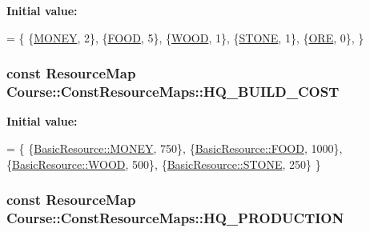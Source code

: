 {\bfseries Initial value\-:}
\begin{DoxyCode}
= \{
    \{\hyperlink{namespaceCourse_a02d49c04029594d4adba79b84bb85f65aff016add6bbbdbb44abf1d2d7f215ec0}{MONEY}, 2\},
    \{\hyperlink{namespaceCourse_a02d49c04029594d4adba79b84bb85f65a7018c47af38bfc1390a89e70b4cf4760}{FOOD}, 5\},
    \{\hyperlink{namespaceCourse_a02d49c04029594d4adba79b84bb85f65a87287be3009253b983ffb2e9f91eef22}{WOOD}, 1\},
    \{\hyperlink{namespaceCourse_a02d49c04029594d4adba79b84bb85f65a8598c3079c2be7785410e724cc190229}{STONE}, 1\},
    \{\hyperlink{namespaceCourse_a02d49c04029594d4adba79b84bb85f65af416a215c7dad21349df38d35be0a1e1}{ORE}, 0\},
\}
\end{DoxyCode}
\hypertarget{namespaceCourse_1_1ConstResourceMaps_a629a12b3f9357cd851c54f2126d22502}{
\subsubsection[{H\-Q\-\_\-\-B\-U\-I\-L\-D\-\_\-\-C\-O\-S\-T}]{\setlength{\rightskip}{0pt plus 5cm}const {\bf Resource\-Map} Course\-::\-Const\-Resource\-Maps\-::\-H\-Q\-\_\-\-B\-U\-I\-L\-D\-\_\-\-C\-O\-S\-T}}\label{namespaceCourse_1_1ConstResourceMaps_a629a12b3f9357cd851c54f2126d22502}
{\bfseries Initial value\-:}
\begin{DoxyCode}
= \{
    \{\hyperlink{namespaceCourse_a02d49c04029594d4adba79b84bb85f65aff016add6bbbdbb44abf1d2d7f215ec0}{BasicResource::MONEY}, 750\},
    \{\hyperlink{namespaceCourse_a02d49c04029594d4adba79b84bb85f65a7018c47af38bfc1390a89e70b4cf4760}{BasicResource::FOOD}, 1000\},
    \{\hyperlink{namespaceCourse_a02d49c04029594d4adba79b84bb85f65a87287be3009253b983ffb2e9f91eef22}{BasicResource::WOOD}, 500\},
    \{\hyperlink{namespaceCourse_a02d49c04029594d4adba79b84bb85f65a8598c3079c2be7785410e724cc190229}{BasicResource::STONE}, 250\}
\}
\end{DoxyCode}
\hypertarget{namespaceCourse_1_1ConstResourceMaps_aabaaa4f78c30eed6e966b596423c8dea}{
\subsubsection[{H\-Q\-\_\-\-P\-R\-O\-D\-U\-C\-T\-I\-O\-N}]{\setlength{\rightskip}{0pt plus 5cm}const {\bf Resource\-Map} Course\-::\-Const\-Resource\-Maps\-::\-H\-Q\-\_\-\-P\-R\-O\-D\-U\-C\-T\-I\-O\-N}}\label{namespaceCourse_1_1ConstResourceMaps_aabaaa4f78c30eed6e966b596423c8dea}
